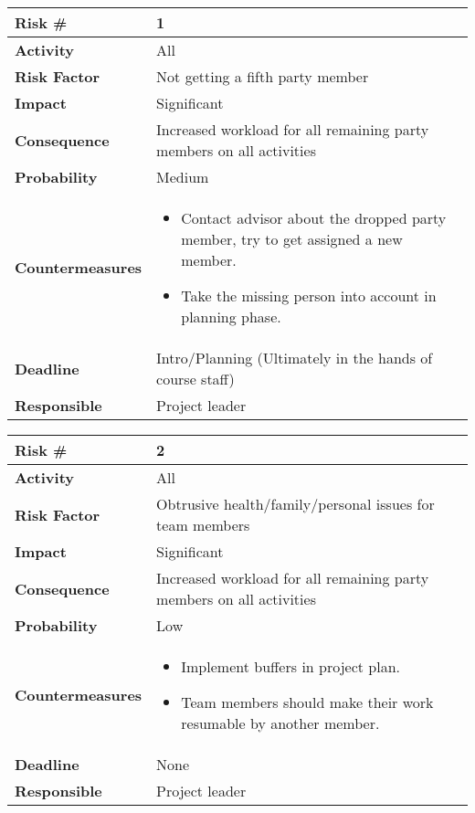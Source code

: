 \begin{tabularx}{\textwidth}{ | l | X | }
\hline
\textbf{Risk \#} & 1 \\ \hline
\textbf{Activity} & All \\ \hline
\textbf{Risk Factor} & Not getting a fifth party member \\ \hline
\textbf{Impact} & Significant \\ \hline
\textbf{Consequence} & Increased workload for all remaining party members on all activities \\ \hline
\textbf{Probability} & Medium \\ \hline
\textbf{Countermeasures} & \begin{itemize}
  \item  Contact advisor about the dropped party member, try to get assigned a new member.
  \item Take the missing person into account in planning phase.
\end{itemize}  \\ \hline
\textbf{Deadline} & Intro/Planning (Ultimately in the hands of course staff) \\ \hline
\textbf{Responsible} & Project leader \\ \hline
\end{tabularx}



\begin{tabularx}{\textwidth}{ | l | X | }
\hline
\textbf{Risk \#} & 2 \\ \hline
\textbf{Activity} & All \\ \hline
\textbf{Risk Factor} & Obtrusive health/family/personal issues for team members \\ \hline
\textbf{Impact} & Significant \\ \hline
\textbf{Consequence} & Increased workload for all remaining party members on all activities \\ \hline
\textbf{Probability} & Low  \\ \hline
\textbf{Countermeasures} & \begin{itemize}
  \item Implement buffers in project plan.
  \item Team members should make their work resumable by another member.
\end{itemize}  \\ \hline
\textbf{Deadline} &  None \\ \hline
\textbf{Responsible} & Project leader \\ \hline
\end{tabularx}

